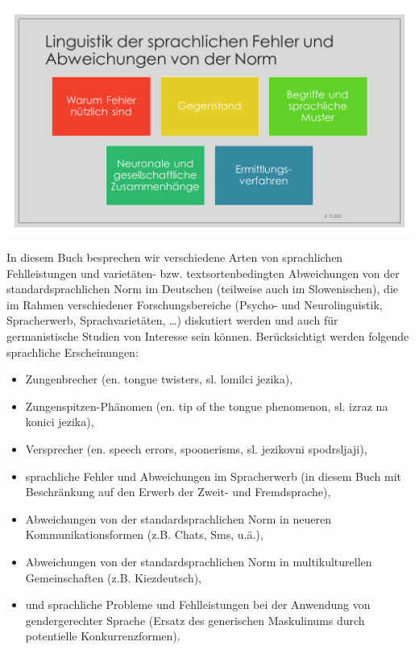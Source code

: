 \documentclass[
  letterpaper,
]{scrbook}
\providecommand{\tightlist}{%
  \setlength{\itemsep}{0pt}\setlength{\parskip}{0pt}}\usepackage{longtable,booktabs,array}
\begin{document}
\includegraphics[width=1\textwidth,height=\textheight]{./pictures/Diapozitiv5.PNG}

In diesem Buch besprechen wir verschiedene Arten von sprachlichen
Fehlleistungen und varietäten- bzw. textsortenbedingten Abweichungen von
der standardsprachlichen Norm im Deutschen (teilweise auch im
Slowenischen), die im Rahmen verschiedener Forschungsbereiche (Psycho-
und Neurolinguistik, Spracherwerb, Sprachvarietäten, \ldots) diskutiert
werden und auch für germanistische Studien von Interesse sein können.
Berücksichtigt werden folgende sprachliche Erscheinungen:\\

\begin{itemize}
\tightlist
\item
  Zungenbrecher (en. tongue twisters, sl. lomilci jezika),\\
\item
  Zungenspitzen-Phänomen (en. tip of the tongue phenomenon, sl. izraz na
  konici jezika),\\
\item
  Versprecher (en. speech errors, spoonerisms, sl. jezikovni
  spodrsljaji),\\
\item
  sprachliche Fehler und Abweichungen im Spracherwerb (in diesem Buch
  mit Beschränkung auf den Erwerb der Zweit- und Fremdsprache),\\
\item
  Abweichungen von der standardsprachlichen Norm in neueren
  Kommunikationsformen (z.B. Chats, Sms, u.ä.),\\
\item
  Abweichungen von der standardsprachlichen Norm in multikulturellen
  Gemeinschaften (z.B. Kiezdeutsch),\\
\item
  und sprachliche Probleme und Fehlleistungen bei der Anwendung von
  gendergerechter Sprache (Ersatz des generischen Maskulinums durch
  potentielle Konkurrenzformen).\\
\end{itemize}
\end{document}

